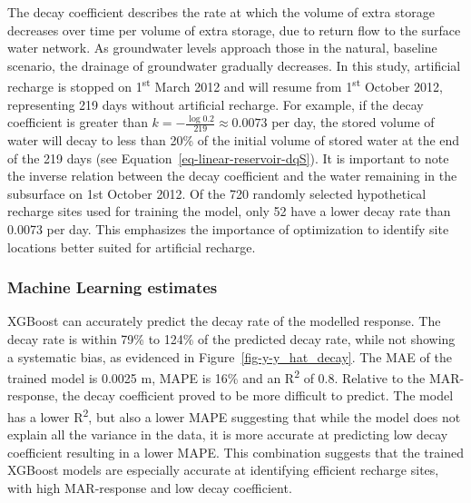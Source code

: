 \documentclass[
]{agujournal2019}
\begin{document}
The decay coefficient describes the rate at which the volume of extra
storage decreases over time per volume of extra storage, due to return
flow to the surface water network. As groundwater levels approach those
in the natural, baseline scenario, the drainage of groundwater gradually
decreases. In this study, artificial recharge is stopped on
1\textsuperscript{st} March 2012 and will resume from
1\textsuperscript{st} October 2012, representing 219 days without
artificial recharge. For example, if the decay coefficient is greater
than \(k = - \frac{\log 0.2} {219} \approx 0.0073\) per day, the stored
volume of water will decay to less than 20\% of the initial volume of
stored water at the end of the 219 days (see
Equation~\ref{eq-linear-reservoir-dqS}). It is important to note the
inverse relation between the decay coefficient and the water remaining
in the subsurface on 1st October 2012. Of the 720 randomly selected
hypothetical recharge sites used for training the model, only 52 have a
lower decay rate than 0.0073 per day. This emphasizes the importance of
optimization to identify site locations better suited for artificial
recharge.

\subsubsection{Machine Learning
estimates}\label{machine-learning-estimates-1}

XGBoost can accurately predict the decay rate of the modelled response.
The decay rate is within 79\% to 124\% of the predicted decay rate,
while not showing a systematic bias, as evidenced in
Figure~\ref{fig-y-y_hat_decay}. The MAE of the trained model is 0.0025
m, MAPE is 16\% and an R\textsuperscript{2} of 0.8. Relative to the
MAR-response, the decay coefficient proved to be more difficult to
predict. The model has a lower R\textsuperscript{2}, but also a lower
MAPE suggesting that while the model does not explain all the variance
in the data, it is more accurate at predicting low decay coefficient
resulting in a lower MAPE. This combination suggests that the trained
XGBoost models are especially accurate at identifying efficient recharge
sites, with high MAR-response and low decay coefficient.
\end{document}
